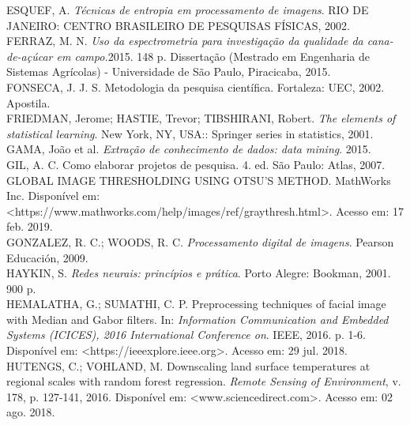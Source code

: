 \noindent ESQUEF, A. \textit{Técnicas de entropia em processamento de imagens}. RIO DE JANEIRO: CENTRO BRASILEIRO DE PESQUISAS FÍSICAS, 2002.
\\

\noindent FERRAZ, M. N. \textit{Uso da espectrometria para investigação da qualidade da cana-de-açúcar em campo.}2015. 148 p. Dissertação (Mestrado em Engenharia de Sistemas Agrícolas) - Universidade de São Paulo, Piracicaba, 2015.
\\

\noindent FONSECA, J. J. S. Metodologia da pesquisa científica. Fortaleza: UEC, 2002. Apostila.
\\

\noindent FRIEDMAN, Jerome; HASTIE, Trevor; TIBSHIRANI, Robert. \textit{The elements of statistical learning}. New York, NY, USA:: Springer series in statistics, 2001.
\\

\noindent GAMA, João et al. \textit{Extração de conhecimento de dados: data mining}. 2015.
\\

\noindent GIL, A. C. Como elaborar projetos de pesquisa. 4. ed. São Paulo: Atlas, 2007.
\\

\noindent GLOBAL IMAGE THRESHOLDING USING OTSU'S METHOD. MathWorks Inc. Disponível em: <https://www.mathworks.com/help/images/ref/graythresh.html>. Acesso em: 17 feb. 2019.
\\

\noindent GONZALEZ, R. C.; WOODS, R. C. \textit{Processamento digital de imagens}. Pearson Educación, 2009.
\\

\noindent HAYKIN, S. \textit{Redes neurais: princípios e prática}. Porto Alegre: Bookman, 2001. 900 p.
\\

\noindent HEMALATHA, G.; SUMATHI, C. P. Preprocessing techniques of facial image with Median and Gabor filters. In: \textit{Information Communication and Embedded Systems (ICICES), 2016 International Conference on}. IEEE, 2016. p. 1-6. Disponível em: <https://ieeexplore.ieee.org>. Acesso em: 29 jul. 2018.
\\

\noindent HUTENGS, C.; VOHLAND, M. Downscaling land surface temperatures at regional scales with random forest regression. \textit{Remote Sensing of Environment}, v. 178, p. 127-141, 2016. Disponível em: <www.sciencedirect.com>. Acesso em: 02 ago. 2018.
\\

